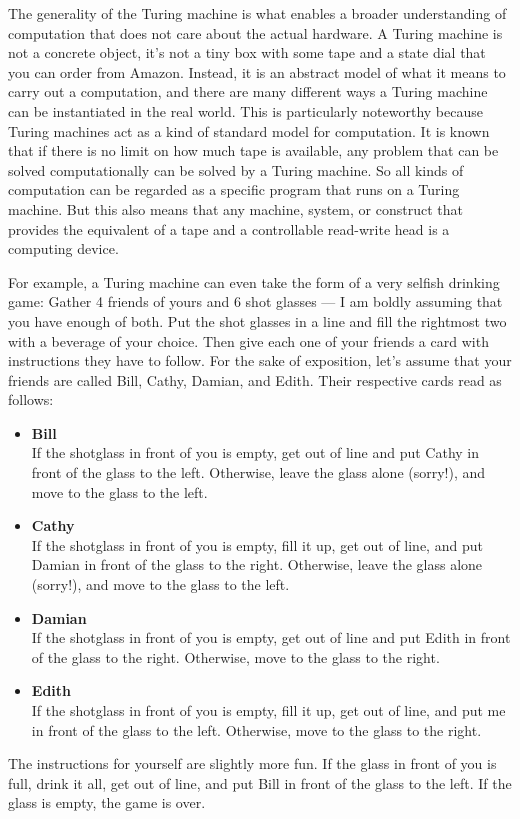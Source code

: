 The generality of the Turing machine is what enables a broader understanding of computation that does not care about the actual hardware.
A Turing machine is not a concrete object, it's not a tiny box with some tape and a state dial that you can order from Amazon.
Instead, it is an abstract model of what it means to carry out a computation, and there are many different ways a Turing machine can be instantiated in the real world.
This is particularly noteworthy because Turing machines act as a kind of standard model for computation.
It is known that if there is no limit on how much tape is available, any problem that can be solved computationally can be solved by a Turing machine.
So all kinds of computation can be regarded as a specific program that runs on a Turing machine.
But this also means that any machine, system, or construct that provides the equivalent of a tape and a controllable read-write head is a computing device.

For example, a Turing machine can even take the form of a very selfish drinking game:
Gather 4 friends of yours and 6 shot glasses --- I am boldly assuming that you have enough of both.
Put the shot glasses in a line and fill the rightmost two with a beverage of your choice.
Then give each one of your friends a card with instructions they have to follow.
For the sake of exposition, let's assume that your friends are called Bill, Cathy, Damian, and Edith.
Their respective cards read as follows:
%
\begin{itemize}
    \item \textbf{Bill}\\
        If the shotglass in front of you is empty, get out of line and put Cathy in front of the glass to the left.
        Otherwise, leave the glass alone (sorry!), and move to the glass to the left.

    \item \textbf{Cathy}\\
        If the shotglass in front of you is empty, fill it up, get out of line, and put Damian in front of the glass to the right.
        Otherwise, leave the glass alone (sorry!),  and move to the glass to the left.

    \item \textbf{Damian}\\
        If the shotglass in front of you is empty, get out of line and put Edith in front of the glass to the right.
        Otherwise, move to the glass to the right.

    \item \textbf{Edith}\\
        If the shotglass in front of you is empty, fill it up, get out of line, and put me in front of the glass to the left.
        Otherwise, move to the glass to the right.
\end{itemize}
%
The instructions for yourself are slightly more fun.
If the glass in front of you is full, drink it all, get out of line, and put Bill in front of the glass to the left.
If the glass is empty, the game is over.

